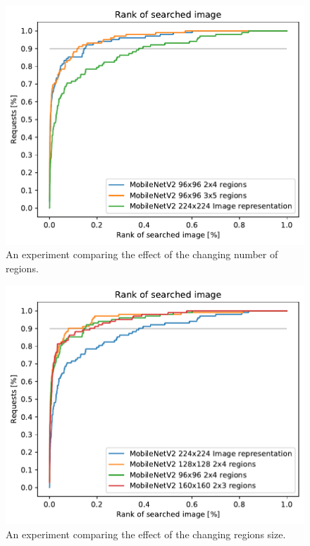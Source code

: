 \begin{figure}
\centering
\includegraphics[width=\textwidth]{graphs/0c36458e4a7754f349e4dd02e823acc5f192f0aaa42647313045530525f3db19.pdf}
\caption{An experiment comparing the effect of the changing number of regions.}
\label{fig:different_number_regions}
\end{figure}

\begin{figure}
\centering
\includegraphics[width=\textwidth]{graphs/901175c0015f71987720d10953133afa566d88a09a6d7182a074859ff4e8409e.pdf}
\caption{An experiment comparing the effect of the changing regions size.}
\label{fig:different_region_size}
\end{figure}


